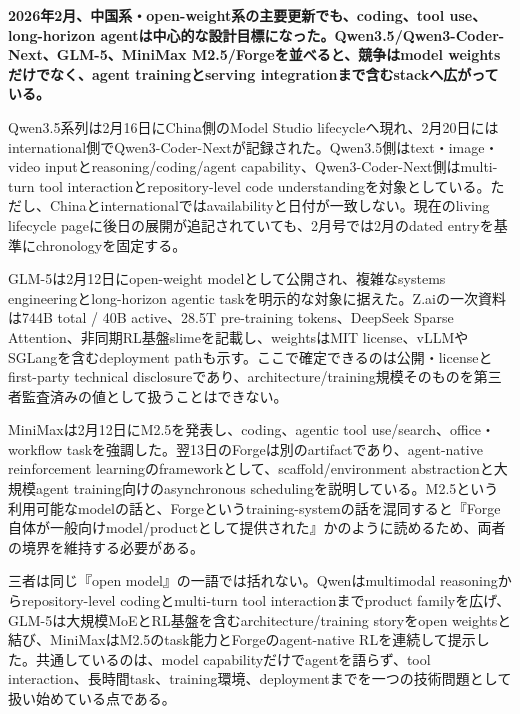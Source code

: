 \noindent\textbf{2026年2月、中国系・open-weight系の主要更新でも、coding、tool use、long-horizon agentは中心的な設計目標になった。Qwen3.5/Qwen3-Coder-Next、GLM-5、MiniMax M2.5/Forgeを並べると、競争はmodel weightsだけでなく、agent trainingとserving integrationまで含むstackへ広がっている。}\autocite{src-9156c37fb1c2,src-d8e13386974c,src-eac8dfbeb78c}

Qwen3.5系列は2月16日にChina側のModel Studio lifecycleへ現れ、2月20日にはinternational側でQwen3-Coder-Nextが記録された。Qwen3.5側はtext・image・video inputとreasoning/coding/agent capability、Qwen3-Coder-Next側はmulti-turn tool interactionとrepository-level code understandingを対象としている。ただし、Chinaとinternationalではavailabilityと日付が一致しない。現在のliving lifecycle pageに後日の展開が追記されていても、2月号では2月のdated entryを基準にchronologyを固定する。\autocite{src-eac8dfbeb78c}


GLM-5は2月12日にopen-weight modelとして公開され、複雑なsystems engineeringとlong-horizon agentic taskを明示的な対象に据えた。Z.aiの一次資料は744B total / 40B active、28.5T pre-training tokens、DeepSeek Sparse Attention、非同期RL基盤slimeを記載し、weightsはMIT license、vLLMやSGLangを含むdeployment pathも示す。ここで確定できるのは公開・licenseとfirst-party technical disclosureであり、architecture/training規模そのものを第三者監査済みの値として扱うことはできない。\autocite{src-9156c37fb1c2}


MiniMaxは2月12日にM2.5を発表し、coding、agentic tool use/search、office・workflow taskを強調した。翌13日のForgeは別のartifactであり、agent-native reinforcement learningのframeworkとして、scaffold/environment abstractionと大規模agent training向けのasynchronous schedulingを説明している。M2.5という利用可能なmodelの話と、Forgeというtraining-systemの話を混同すると『Forge自体が一般向けmodel/productとして提供された』かのように読めるため、両者の境界を維持する必要がある。\autocite{src-d8e13386974c}


三者は同じ『open model』の一語では括れない。Qwenはmultimodal reasoningからrepository-level codingとmulti-turn tool interactionまでproduct familyを広げ、GLM-5は大規模MoEとRL基盤を含むarchitecture/training storyをopen weightsと結び、MiniMaxはM2.5のtask能力とForgeのagent-native RLを連続して提示した。共通しているのは、model capabilityだけでagentを語らず、tool interaction、長時間task、training環境、deploymentまでを一つの技術問題として扱い始めている点である。\autocite{src-9156c37fb1c2,src-d8e13386974c,src-eac8dfbeb78c}


